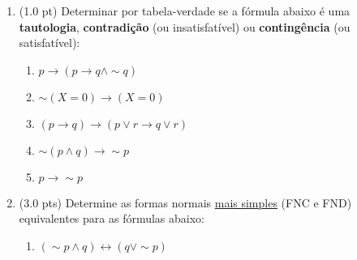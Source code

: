 \documentclass[12pt]{article}
\begin{document}
\begin{enumerate}

\begin{comment}
\item (1.0 pt) Determina o valor lógico das fórmulas abaixo:

\begin{itemize}
\setlength{\itemsep}{-3pt}
\item $-2 < 0 \leftrightarrow \pi^2 < 0 \wedge $ Roma é a capital da Itália
\item $3+4=7 \vee 13 $ é um número primo $\rightarrow \sqrt 16 > 2$
\item $3^2 + 4^2 = 5^2  ~\wedge $ Tóquio não fica no Japão $\rightarrow ( \pi > 2.04 \leftrightarrow 2 \neq 3 )$
\item Na Espanha se fala português $\wedge~ 2^3 - 4 > 5^2 - 10 \vee 5 \neq 3+3$
\end{itemize}
\end{comment}

\item (1.0 pt) Determinar por tabela-verdade se a fórmula abaixo é uma {\bf tautologia}, {\bf contradição} (ou insatisfatível) ou {\bf contingência} (ou satisfatível): 

\begin{enumerate}
\setlength{\itemsep}{-2pt}


\item $p \rightarrow (p \rightarrow q \wedge \sim q)$

\item $\sim (X = 0) \rightarrow (X = 0)$

\item $(p \rightarrow q) \rightarrow (p \vee r \rightarrow q \vee r)$

\item $\sim (p \wedge q) \rightarrow \sim p$ 

\item $ p \rightarrow \sim p$ 
\end{enumerate}


\item (3.0 pts) Determine as formas normais \underline{mais simples} (FNC e FND) equivalentes para as fórmulas abaixo: 
\begin{enumerate}
\setlength{\itemsep}{-2pt}

\item $(\sim p \wedge q)  \leftrightarrow  (q \vee \sim p) $


\end{enumerate}
\end{enumerate}
\end{document}
